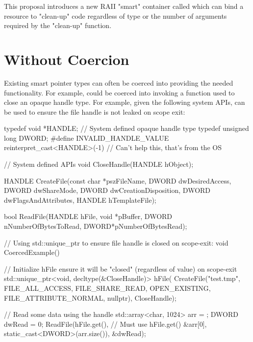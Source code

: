 \documentclass[ebook,11pt,article]{memoir}
\begin{document}
This proposal introduces a new RAII "smart" container called  which can bind a resource to "clean-up" code regardless of type or the number of arguments required by the "clean-up" function.

\section {Without Coercion}
Existing smart pointer types can often be coerced into providing the needed functionality.  For example,  could be coerced into invoking a function used to close an opaque handle type.  For example, given the following system APIs,  can be used to ensure the file handle is not leaked on scope exit:

\begin{codeblock}
typedef void *HANDLE;        // System defined opaque handle type
typedef unsigned long DWORD;
#define INVALID_HANDLE_VALUE reinterpret_cast<HANDLE>(-1)	
// Can't help this, that's from the OS

// System defined APIs
void CloseHandle(HANDLE hObject);

HANDLE CreateFile(const char *pszFileName, 
	DWORD dwDesiredAccess, 
	DWORD dwShareMode, 
	DWORD dwCreationDisposition, 
	DWORD dwFlagsAndAttributes, 
	HANDLE hTemplateFile);

bool ReadFile(HANDLE hFile, 
	void *pBuffer, 
	DWORD nNumberOfBytesToRead, 
	DWORD*pNumberOfBytesRead);

// Using std::unique_ptr to ensure file handle is closed on scope-exit:
void CoercedExample()
{
	// Initialize hFile ensure it will be "closed" (regardless of value) on scope-exit
	std::unique_ptr<void, decltype(&CloseHandle)> hFile(
		CreateFile("test.tmp", 
			FILE_ALL_ACCESS, 
			FILE_SHARE_READ, 
			OPEN_EXISTING, 
			FILE_ATTRIBUTE_NORMAL,
			nullptr), 
		CloseHandle);

	// Read some data using the handle
	std::array<char, 1024> arr = { };
	DWORD dwRead = 0;
	ReadFile(hFile.get(),	// Must use hFile.get()
		&arr[0], 
		static_cast<DWORD>(arr.size()), 
		&dwRead);
}
\end{codeblock}
\end{document}
